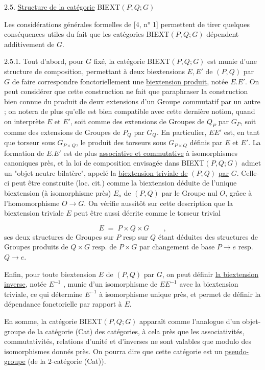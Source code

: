 2.5. \underline{Structure de la catégorie} BIEXT$(P,Q;G)$

Les considérations générales formelles de [4, n° 1] permettent de tirer quelques conséquences utiles du fait que les  catégories BIEXT$(P,Q;G)$  dépendent additivement de $G$.

2.5.1. Tout d'abord, pour $G$ fixé, la catégorie BIEXT$(P,Q;G)$ est munie d'une structure de composition, permettant à deux biextensions $E,E'$ de $(P,Q )$ par $G$ de faire correspondre fonctoriellement une \underline{biextension produit}, notée $E.E'$. On peut considérer que cette construction ne fait que paraphraser la construction bien connue du produit de deux extensions d'un Groupe commutatif par un autre ; on notera de plus qu'elle est bien compatible avec cette dernière notion, quand on interprète $E$ et $E'$, soit comme des extensions de Groupes de $Q_P$ par $G_P$, soit comme des extensions de Groupes de $P_Q$ par $G_Q$. En particulier, $EE'$ est, en tant que torseur
sous $G_{P \times Q}$, le produit des torseurs sous $G_{P \times Q}$ définis par $E$ et $E'$. La formation de $E.E'$ est de plus \underline{associative et commutative} à isomorphismes canoniques près, et la loi de composition envisagée dans BIEXT$(P,Q;G)$ admet un "objet neutre bilatère", appelé la \underline{biextension triviale de} $(P,Q)$ \underline{par} $G$. Celle-ci peut être construite (loc. cit.) comme la biextension déduite de l'unique biextension (à isomorphisme près) $E_o$ de $(P,Q)$ par le Groupe nul $O$, grâce à l'homomorphisme  $O \longrightarrow G$. On vérifie aussitôt sur cette description que la biextension triviale $E$ peut être aussi décrite comme le torseur trivial

\begin{equation*}
E \;=\; P \times Q \times G \qquad ,
\end{equation*}
ses deux structures de Groupes sur $P$ resp  sur $Q$ étant déduites des structures de Groupes produits de $Q \times G$ resp. de $P \times G$ par changement de base $P \longrightarrow e$ resp. $Q \longrightarrow e$.

Enfin, pour toute biextension $E$ de $(P,Q)$ par $G$, on peut définir \underline{la biextension inverse}, notée $E^{-1}$ , munie d'un isomorphisme de $EE^{-1}$ avec la biextension triviale, ce qui détermine $E^{-1}$ à isomorphisme unique près, et permet de définir la dépendance fonctorielle par rapport à $E$.

En somme, la catégorie BIEXT$(P,Q;G)$ apparaît comme l'analogue d'un objet-groupe de la catégorie (Cat) des catégories, à cela près que les associativités, commutativités, relations d'unité et d'inverses ne sont valables que modulo des isomorphismes donnés près. On pourra dire que cette catégorie est un \underline{pseudo-groupe} (de la 2-catégorie (Cat)).


